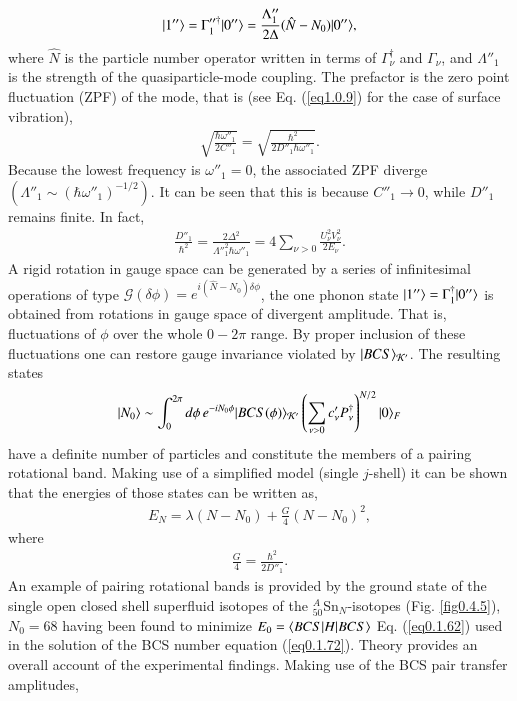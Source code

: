 \begin{align}\label{eq0.1.98}
|{1''} \rangle=\Gamma''^\dagger_1|{0''} \rangle=\frac{\Lambda''_1}{2\Delta}(\hat N-N_0)|{0''} \rangle,	
\end{align}
where $\hat N$ is the particle number operator written in terms of $\Gamma^\dagger_\nu$ and $\Gamma_\nu$, and $\Lambda''_1$ is the strength of the quasiparticle-mode coupling. The prefactor is the zero point fluctuation (ZPF) of the mode, that is (see Eq. (\ref{eq1.0.9}) for the case of surface vibration),
\begin{align}\label{eq0.1.99}
\sqrt{\frac{\hbar\omega''_1}{2C''_1}}=\sqrt{\frac{\hbar^2}{2D''_1\hbar\omega''_1}}.
\end{align}
Because the lowest frequency is $\omega''_1=0$, the associated ZPF diverge $(\Lambda''_1\sim(\hbar\omega''_1)^{-1/2})$. It can be seen that this is because $C''_1\to0$, while $D''_1$ remains finite. In fact,
\begin{align}\label{eq0.1.100}
\frac{D''_1}{\hbar^2}=\frac{2\Delta^2}{\Lambda''^2_1\hbar\omega''_1}=4\sum_{\nu>0}\frac{U^2_\nu V^2_\nu}{2E_\nu}.
\end{align}
 A rigid rotation in gauge space can be generated by a series of infinitesimal operations of type $\mathcal G(\delta\phi)=e^{i(\hat N-N_0)\delta\phi}$, the one phonon state $|{1''} \rangle=\Gamma^\dagger_1|{0''} \rangle$ is obtained from rotations in gauge space of divergent amplitude. That is, fluctuations of $\phi$ over the whole $0-2\pi$ range. By proper inclusion of these fluctuations one can restore gauge invariance violated by $|{BCS} \rangle_{\mathcal K'}$. The resulting states
\begin{align}\label{eq0.1.101}
|{N_0} \rangle\sim\int^{2\pi}_0d\phi\,e^{-iN_0\phi}|{BCS(\phi)} \rangle_{\mathcal K'}\left(\sum_{\nu>0}c'_\nu P^\dagger_\nu\right)^{N/2}|{0} \rangle_F
\end{align}
have a definite number of particles and constitute the members of a pairing rotational band. Making use of a simplified model (single $j$-shell) it can be shown that the energies of those states can be written as,
\begin{align}\label{eq0.1.102}
E_N=\lambda(N-N_0)+\frac{G}{4}\left(N-N_0\right)^2,
\end{align}
where 
\begin{align}\label{eq0.1.103}
\frac{G}{4}=\frac{\hbar^2}{2D''_1}.
\end{align}
An example of pairing rotational bands is provided by the ground state of the single open closed shell superfluid isotopes of the $^A_{50}$Sn$_N$-isotopes (Fig. \ref{fig0.4.5}), $N_0=68$ having been found to minimize $E_0=\langle {BCS|H|BCS} \rangle$ Eq. (\ref{eq0.1.62}) used in the solution of the BCS number equation (\ref{eq0.1.72}). Theory provides an overall account of the experimental findings. Making use of the BCS pair transfer amplitudes,
